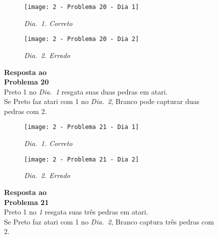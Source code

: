 \begin{SCfigure}[][h!]
    \begin{subfigure}[t]{.31\textwidth}
        \texttt{[image: 2 - Problema 20 - Dia 1]}
        \captionsetup{justification=centering}
        \caption*{\emph{Dia.\@~1. Correto}}
    \end{subfigure}
    \hfill
    \begin{subfigure}[t]{.31\textwidth}
        \texttt{[image: 2 - Problema 20 - Dia 2]}
        \captionsetup{justification=centering}
        \caption*{\emph{Dia.\@~2. Errado}}
    \end{subfigure}
    \hfill
    \caption*{\textbf{Resposta ao\\Problema 20}\\\vspace*{.25cm}Preto 1 no \emph{Dia.\@~1} resgata suas duas pedras em atari.\\\vspace*{.25cm}Se Preto faz atari com 1 no \emph{Dia.\@~2}, Branco pode capturar duas pedras com 2.}
\end{SCfigure}

\vfill

\begin{SCfigure}[][h!]
    \begin{subfigure}[t]{.31\textwidth}
        \texttt{[image: 2 - Problema 21 - Dia 1]}
        \captionsetup{justification=centering}
        \caption*{\emph{Dia.\@~1. Correto}}
    \end{subfigure}
    \hfill
    \begin{subfigure}[t]{.31\textwidth}
        \texttt{[image: 2 - Problema 21 - Dia 2]}
        \captionsetup{justification=centering}
        \caption*{\emph{Dia.\@~2. Errado}}
    \end{subfigure}
    \hfill
    \caption*{\textbf{Resposta ao\\Problema 21}\\\vspace*{.25cm}Preto 1 no \emph{1} resgata suas três pedras em atari.\\\vspace*{.25cm}Se Preto faz atari com 1 no \emph{Dia.\@~2}, Branco captura três pedras com 2.}
\end{SCfigure}

\pagebreak

